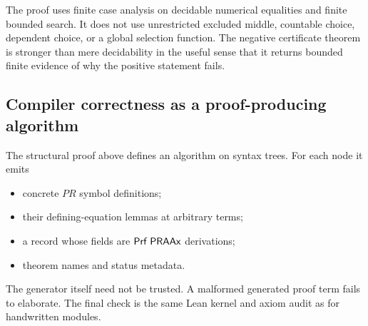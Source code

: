 The proof uses finite case analysis on decidable numerical equalities and finite
bounded search.  It does not use unrestricted excluded middle, countable
choice, dependent choice, or a global selection function.  The negative
certificate theorem is stronger than mere decidability in the useful sense
that it returns bounded finite evidence of why the positive statement fails.

\subsection{Compiler correctness as a proof-producing algorithm}

The structural proof above defines an algorithm on syntax trees.  For each
node it emits

\begin{itemize}
\item concrete \(PR\) symbol definitions;
\item their defining-equation lemmas at arbitrary terms;
\item a  record whose fields are \(\mathsf{Prf}\;\mathsf{PRAAx}\)
derivations;
\item theorem names and status metadata.
\end{itemize}

The generator itself need not be trusted.  A malformed generated proof term
fails to elaborate.  The final check is the same Lean kernel and axiom audit as
for handwritten  modules.
